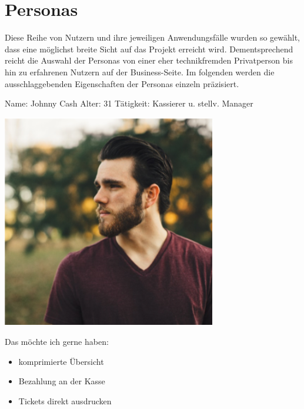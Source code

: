 \section{Personas}
Diese Reihe von Nutzern und ihre jeweiligen Anwendungsfälle wurden so gewählt, dass eine möglichst breite Sicht auf das Projekt erreicht wird.
Dementsprechend reicht die Auswahl der Personas von einer eher technikfremden Privatperson bis hin zu erfahrenen Nutzern auf der Business-Seite.
Im folgenden werden die ausschlaggebenden Eigenschaften der Personas einzeln präzisiert.

\begin{minipage}[t]{0.5\textwidth} 	\vspace{0.2\baselineskip} %
	\begin{entrylist}
		\entry
		{Name:}
		{Johnny Cash}
			\entry
		{Alter:}
		{31}
		\entry
		{Tätigkeit:}
		{Kassierer u. stellv. Manager}
	\end{entrylist}
	\begin{barchart}{5.0}\hspace{-1mm}
	\end{barchart}
\end{minipage}
\hfil
\begin{minipage}[t]{0.4\textwidth} 	\vspace{0.0\baselineskip} %
	\flushright
	\includegraphics[width=0.70\textwidth]{img/personas/johnny}
\end{minipage}

Das möchte ich gerne haben:
\begin{itemize}
	\item komprimierte Übersicht
	\item Bezahlung an der Kasse
	\item Tickets direkt ausdrucken
\end{itemize}

